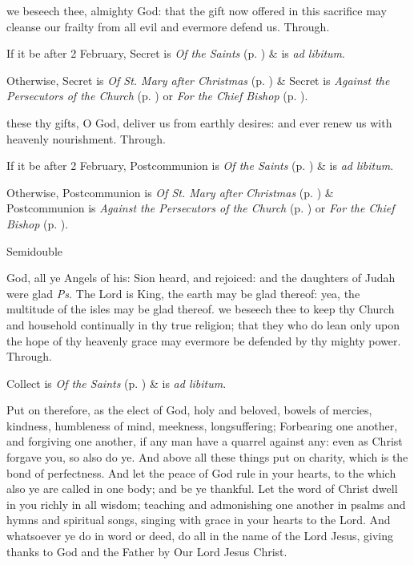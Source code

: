\secret
{} we beseech thee, almighty God: that the gift now offered in this sacrifice may cleanse our frailty from all evil and evermore defend us. Through.
\begin{rubric}
    If it be after 2 February,  Secret is \emph{Of the Saints} (p. \pageref{SPSaints}) \&  is \emph{ad libitum}.\par
    Otherwise,  Secret is \emph{Of St. Mary after Christmas} (p. \pageref{SPMaryPostChristmas}) \&  Secret is \emph{Against the Persecutors of the Church} (p. \pageref{SPAgainst}) or \emph{For the Chief Bishop} (p. \pageref{SPChiefBishop}).
\end{rubric}
\postcommunion
{} these thy gifts, O God, deliver us from earthly desires: and ever renew us with heavenly nourishment. Through.
\begin{rubric}
    If it be after 2 February,  Postcommunion is \emph{Of the Saints} (p. \pageref{SPSaints}) \&  is \emph{ad libitum}.\par
    Otherwise,  Postcommunion is \emph{Of St. Mary after Christmas} (p. \pageref{SPMaryPostChristmas}) \&  Postcommunion is \emph{Against the Persecutors of the Church} (p. \pageref{SPAgainst}) or \emph{For the Chief Bishop} (p. \pageref{SPChiefBishop}).
\end{rubric}


\label{EpiphanyV}
\begin{inhead}
{Semidouble}
\end{inhead}

\properantiphonfix

\introit
{} God, all ye Angels of his: Sion heard, and rejoiced: and the daughters of Judah were glad \textit{Ps.} The Lord is King, the earth may be glad thereof: yea, the multitude of the isles may be glad thereof.
\collect\label{EpiphanyVCollect}
 we beseech thee to keep thy Church and household continually in thy true religion; that they who do lean only upon the hope of thy heavenly grace may evermore be defended by thy mighty power. Through.
\begin{rubric}
     Collect is \emph{Of the Saints} (p. \pageref{SPSaints}) \&  is \emph{ad libitum}.
\end{rubric}
 Put on therefore, as the elect of God, holy and beloved, bowels of mercies, kindness, humbleness of mind, meekness, longsuffering; Forbearing one another, and forgiving one another, if any man have a quarrel against any: even as Christ forgave you, so also do ye. And above all these things put on charity, which is the bond of perfectness. And let the peace of God rule in your hearts, to the which also ye are called in one body; and be ye thankful. Let the word of Christ dwell in you richly in all wisdom; teaching and admonishing one another in psalms and hymns and spiritual songs, singing with grace in your hearts to the Lord. And whatsoever ye do in word or deed, do all in the name of the Lord Jesus, giving thanks to God and the Father by Our Lord Jesus Christ.


